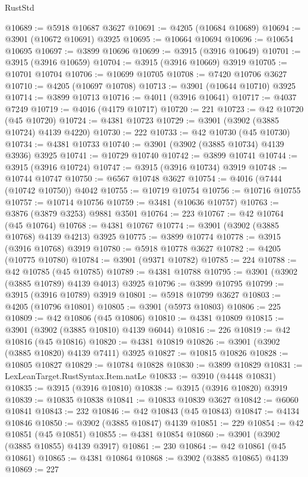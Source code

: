 \begin{lexlean}{RustStd}
\begin{coremodule}
@10689 := @5918 @10687 @3627
@10691 := @4205 (@10684 @10689)
@10694 := @3901 (@10672 @10691) @3925
@10695 := @10664 @10694
@10696 := @10654 @10695
@10697 := @3899 @10696
@10699 := @3915 (@3916 @10649)
@10701 := @3915 (@3916 @10659)
@10704 := @3915 (@3916 @10669) @3919
@10705 := @10701 @10704
@10706 := @10699 @10705
@10708 := @7420 @10706 @3627
@10710 := @4205 (@10697 @10708)
@10713 := @3901 (@10644 @10710) @3925
@10714 := @3899 @10713
@10716 := @4011 (@3916 @10641)
@10717 := @4037 @7249
@10719 := @4016 (@4179 @10717)
@10720 := 221
@10723 := @42 @10720 (@45 @10720)
@10724 := @4381 @10723
@10729 := @3901 (@3902 (@3885 @10724) @4139 @4220)
@10730 := 222
@10733 := @42 @10730 (@45 @10730)
@10734 := @4381 @10733
@10740 := @3901 (@3902 (@3885 @10734) @4139 @3936) @3925
@10741 := @10729 @10740
@10742 := @3899 @10741
@10744 := @3915 (@3916 @10724)
@10747 := @3915 (@3916 @10734) @3919
@10748 := @10744 @10747
@10750 := @6567 @10748 @3627
@10754 := @4016 (@7444 (@10742 @10750)) @4042
@10755 := @10719 @10754
@10756 := @10716 @10755
@10757 := @10714 @10756
@10759 := @3481 (@10636 @10757)
@10763 := @3876 (@3879 @3253) @9881 @3501
@10764 := 223
@10767 := @42 @10764 (@45 @10764)
@10768 := @4381 @10767
@10774 := @3901 (@3902 (@3885 @10768) @4139 @4213) @3925
@10775 := @3899 @10774
@10778 := @3915 (@3916 @10768) @3919
@10780 := @5918 @10778 @3627
@10782 := @4205 (@10775 @10780)
@10784 := @3901 (@9371 @10782)
@10785 := 224
@10788 := @42 @10785 (@45 @10785)
@10789 := @4381 @10788
@10795 := @3901 (@3902 (@3885 @10789) @4139 @4013) @3925
@10796 := @3899 @10795
@10799 := @3915 (@3916 @10789) @3919
@10801 := @5918 @10799 @3627
@10803 := @4205 (@10796 @10801)
@10805 := @3901 (@5973 @10803)
@10806 := 225
@10809 := @42 @10806 (@45 @10806)
@10810 := @4381 @10809
@10815 := @3901 (@3902 (@3885 @10810) @4139 @6044)
@10816 := 226
@10819 := @42 @10816 (@45 @10816)
@10820 := @4381 @10819
@10826 := @3901 (@3902 (@3885 @10820) @4139 @7411) @3925
@10827 := @10815 @10826
@10828 := @10805 @10827
@10829 := @10784 @10828
@10830 := @3899 @10829
@10831 := LexLeanTarget.RustSyntax.Item.natLe
@10833 := @3910 (@4448 @10831)
@10835 := @3915 (@3916 @10810)
@10838 := @3915 (@3916 @10820) @3919
@10839 := @10835 @10838
@10841 := @10833 @10839 @3627
@10842 := @6060 @10841
@10843 := 232
@10846 := @42 @10843 (@45 @10843)
@10847 := @4134 @10846
@10850 := @3902 (@3885 @10847) @4139
@10851 := 229
@10854 := @42 @10851 (@45 @10851)
@10855 := @4381 @10854
@10860 := @3901 (@3902 (@3885 @10855) @4139 @3917)
@10861 := 230
@10864 := @42 @10861 (@45 @10861)
@10865 := @4381 @10864
@10868 := @3902 (@3885 @10865) @4139
@10869 := 227

\end{coremodule}
\end{lexlean}
